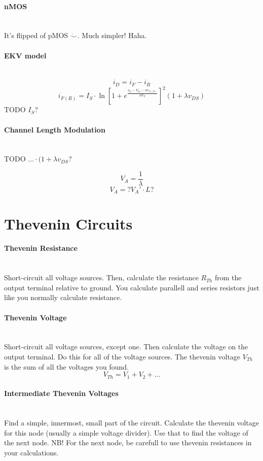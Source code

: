 \documentclass[twocolumn]{article}
\begin{document}
    \paragraph{nMOS} \hfill \\
      It's flipped of pMOS $\ddot\smile$. Much simpler! Haha.
    \paragraph{EKV model} \hfill \\
      $$i_D = i_F - i_R$$
      $$i_{F(R)} = I_S \cdot
                   \ln \left[ 1 + e^{\frac{v_G - V_{tn} - nv_{S(D)}}{nV_T}}
                       \right] ^2
                   (1 + \lambda v_{DS})$$
      TODO $I_S$?
    \paragraph{Channel Length Modulation} \hfill \\
      TODO $... \cdot (1 + \lambda v_{DS}$?

      $$V_A = \frac{1}{\lambda}$$
      $$V_A = ?V_A' \cdot L?$$
  \section{Thevenin Circuits}
    \paragraph{Thevenin Resistance} \hfill \\
      Short-circuit all voltage sources.
      Then, calculate the resistance $R_{Th}$ from the output terminal relative
      to ground.
      You calculate parallell and series resistors just like you normally
     calculate resistance.
    \paragraph{Thevenin Voltage} \hfill \\
      Short-circuit all voltage sources, except one.
      Then calculate the voltage on the output terminal.
      Do this for all of the voltage sources.
      The thevenin voltage $V_{Th}$ is the sum of all the voltages you found.
      $$V_{Th} = V_1 + V_2 + ...$$
    \paragraph{Intermediate Thevenin Voltages} \hfill \\
      Find a simple, innermost, small part of the circuit.
      Calculate the thevenin voltage for this node (usually a simple voltage
      divider).
      Use that to find the voltage of the next node.
      NB! For the next node, be carefull to use thevenin resistances in
      your calculations.
\end{document}
